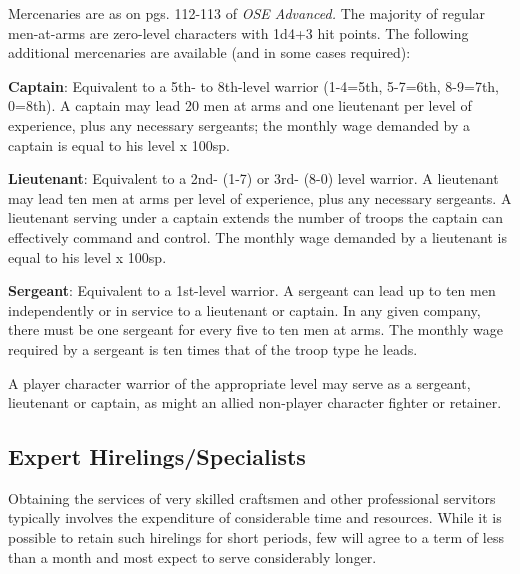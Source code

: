 \documentclass{article}
\begin{document}
\begin{multicols}{2}
Mercenaries are as on pgs. 112-113 of \emph{OSE Advanced.} The majority
of regular men-at-arms are zero-level characters with 1d4+3 hit points.
The following additional mercenaries are available (and in some cases
required):

\textbf{Captain}: Equivalent to a 5th- to 8th-level warrior (1-4=5th,
5-7=6th, 8-9=7th, 0=8th). A captain may lead 20 men at arms and one
lieutenant per level of experience, plus any necessary sergeants; the
monthly wage demanded by a captain is equal to his level x 100sp.

\textbf{Lieutenant}: Equivalent to a 2nd- (1-7) or 3rd- (8-0) level
warrior. A lieutenant may lead ten men at arms per level of experience,
plus any necessary sergeants. A lieutenant serving under a captain
extends the number of troops the captain can effectively command and
control. The monthly wage demanded by a lieutenant is equal to his level
x 100sp.

\textbf{Sergeant}: Equivalent to a 1st-level warrior. A sergeant can
lead up to ten men independently or in service to a lieutenant or
captain. In any given company, there must be one sergeant for every five
to ten men at arms. The monthly wage required by a sergeant is ten times
that of the troop type he leads.

A player character warrior of the appropriate level may serve as a
sergeant, lieutenant or captain, as might an allied non-player character
fighter or retainer.

\subsection{Expert
Hirelings/Specialists}\label{expert-hirelingsspecialists}

Obtaining the services of very skilled craftsmen and other professional
servitors typically involves the expenditure of considerable time and
resources. While it is possible to retain such hirelings for short
periods, few will agree to a term of less than a month and most expect
to serve considerably longer.


\end{multicols}
\end{document}
